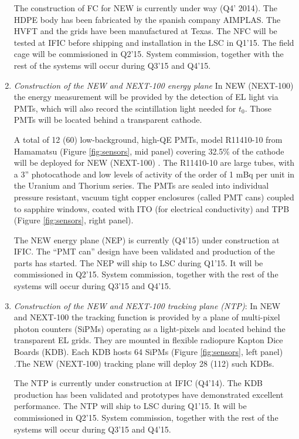 \begin{enumerate}
The construction of FC for NEW is currently under way (Q4' 2014). The HDPE body has been fabricated by the spanish company AIMPLAS. The HVFT and the grids have been manufactured at Texas. The  NFC will be tested at IFIC before shipping and installation in the LSC in Q1'15. The field cage will be commissioned in Q2'15. System commission, together with the rest of the systems will occur during Q3'15 and Q4'15.

\item {\em Construction of the NEW and NEXT-100 energy plane }
In NEW (NEXT-100) the energy measurement will be provided by the detection of EL light via PMTs, which will also record the scintillation light needed for $t_0$. Those PMTs will be located behind a transparent cathode.

A total of 12 (60) low-background, high-QE PMTs, model R11410-10 from Hamamatsu (Figure  \ref{fig:sensors}, mid panel) covering 32.5\% of the cathode will be deployed for NEW (NEXT-100) . The R11410-10 are large tubes, with a 3'' photocathode and low levels of  activity of the order of 1 mBq per unit in the Uranium and Thorium series. The PMTs are sealed into individual pressure resistant, vacuum tight copper enclosures (called PMT cans) coupled to 
sapphire windows, coated with ITO (for electrical conductivity) and TPB (Figure  \ref{fig:sensors}, right panel).

The NEW energy plane (NEP) is currently (Q4'15) under construction at IFIC. The ``PMT can'' design have been validated and production of the parts has started. The NEP will ship to LSC during Q1'15. It will be commissioned in Q2'15. System commission, together with the rest of the systems will occur during Q3'15 and Q4'15.

\item  {\em  Construction of the NEW and NEXT-100 tracking plane (NTP)}:
In NEW and NEXT-100 the tracking function is provided by a plane of multi-pixel photon counters (SiPMs) operating as a light-pixels and located behind the transparent EL grids. They are mounted in flexible radiopure Kapton Dice Boards (KDB). Each KDB hosts 64 SiPMs (Figure  \ref{fig:sensors}, left panel) .The NEW (NEXT-100) tracking plane will deploy 28 (112) such KDBs. 

The NTP is currently under construction at IFIC (Q4'14). The KDB production has been validated and prototypes have demonstrated excellent performance. The NTP will ship to LSC during Q1'15. It will be commissioned in Q2'15. System commission, together with the rest of the systems will occur during Q3'15 and Q4'15. 

\end{enumerate}
 
